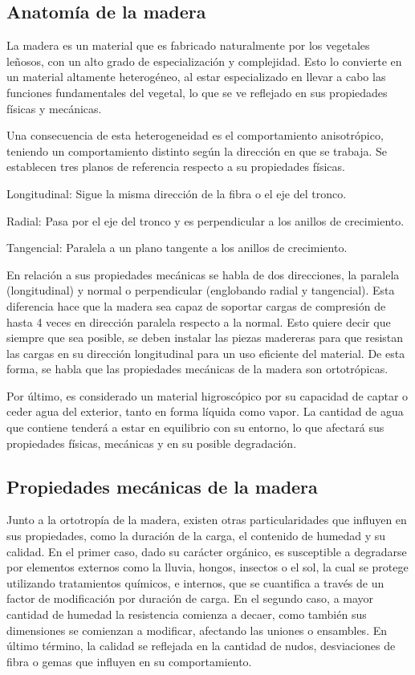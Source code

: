 \subsection{Anatomía de la madera}
La madera es un material que es fabricado naturalmente por los vegetales leñosos, con un alto grado de especialización y complejidad. Esto lo convierte en un material altamente heterogéneo, al estar especializado en llevar a cabo las funciones fundamentales del vegetal, lo que se ve reflejado en sus propiedades físicas y mecánicas. 

Una consecuencia de esta heterogeneidad es el comportamiento anisotrópico, teniendo un comportamiento distinto según la dirección en que se trabaja. Se establecen tres planos de referencia respecto a su propiedades físicas.
\begin{itemize*}
	\item Longitudinal: Sigue la misma dirección de la fibra o el eje del tronco.
	\item Radial: Pasa por el eje del tronco y es perpendicular a los anillos de crecimiento.
	\item Tangencial: Paralela a un plano tangente a los anillos de crecimiento.
\end{itemize*}
En relación a sus propiedades mecánicas se habla de dos direcciones, la paralela (longitudinal) y normal o perpendicular (englobando radial y tangencial). Esta diferencia hace que la madera sea capaz de soportar cargas de compresión de hasta 4 veces en dirección paralela respecto a la normal. Esto quiere decir que siempre que sea posible, se deben instalar las piezas madereras para que resistan las cargas en su dirección longitudinal para un uso eficiente del material. De esta forma, se habla que las propiedades mecánicas de la madera son ortotrópicas.

Por último, es considerado un material higroscópico por su capacidad de captar o ceder agua del exterior, tanto en forma líquida como vapor. La cantidad de agua que contiene tenderá a estar en equilibrio con su entorno, lo que afectará sus propiedades físicas, mecánicas y en su posible degradación.

\subsection{Propiedades mecánicas de la madera}
Junto a la ortotropía de la madera, existen otras particularidades que influyen en sus propiedades, como la duración de la carga, el contenido de humedad y su calidad. En el primer caso, dado su carácter orgánico, es susceptible a degradarse por elementos externos como la lluvia, hongos, insectos o el sol, la cual se protege utilizando tratamientos químicos, e internos, que se cuantifica a través de un factor de modificación por duración de carga. En el segundo caso, a mayor cantidad de humedad la resistencia comienza a decaer, como también sus dimensiones se comienzan a modificar, afectando las uniones o ensambles. En último término, la calidad se reflejada en la cantidad de nudos, desviaciones de fibra o gemas que influyen en su comportamiento.

